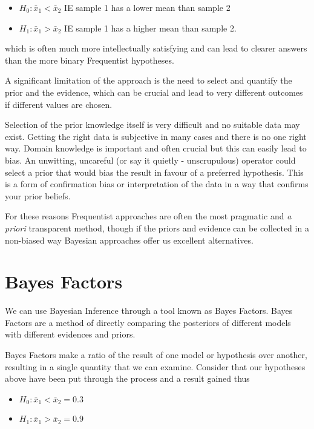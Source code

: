\documentclass[
]{book}
\providecommand{\tightlist}{%
  \setlength{\itemsep}{0pt}\setlength{\parskip}{0pt}}
\begin{document}
\begin{itemize}
\tightlist
\item
  \(H_0 : \bar{x}_1 < \bar{x}_2\) IE sample 1 has a lower mean than sample 2
\item
  \(H_1 : \bar{x}_1 > \bar{x}_2\) IE sample 1 has a higher mean than sample 2.
\end{itemize}

which is often much more intellectually satisfying and can lead to clearer answers than the more binary Frequentist hypotheses.

A significant limitation of the approach is the need to select and quantify the prior and the evidence, which can be crucial and lead to very different outcomes if different values are chosen.

Selection of the prior knowledge itself is very difficult and no suitable data may exist. Getting the right data is subjective in many cases and there is no one right way. Domain knowledge is important and often crucial but this can easily lead to bias. An unwitting, uncareful (or say it quietly - unscrupulous) operator could select a prior that would bias the result in favour of a preferred hypothesis. This is a form of confirmation bias or interpretation of the data in a way that confirms your prior beliefs.

For these reasons Frequentist approaches are often the most pragmatic and \emph{a priori} transparent method, though if the priors and evidence can be collected in a non-biased way Bayesian approaches offer us excellent alternatives.

\hypertarget{bayes-factors}{%
\section{Bayes Factors}\label{bayes-factors}}

We can use Bayesian Inference through a tool known as Bayes Factors. Bayes Factors are a method of directly comparing the posteriors of different models with different evidences and priors.

Bayes Factors make a ratio of the result of one model or hypothesis over another, resulting in a single quantity that we can examine. Consider that our hypotheses above have been put through the process and a result gained thus

\begin{itemize}
\tightlist
\item
  \(H_0 : \bar{x}_1 < \bar{x}_2 = 0.3\)
\item
  \(H_1 : \bar{x}_1 > \bar{x}_2 = 0.9\)
\end{itemize}
\end{document}
